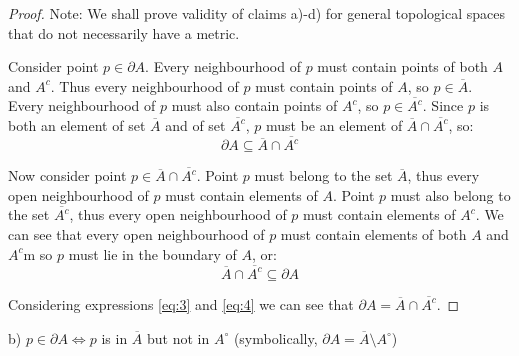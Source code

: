 \documentclass{article}
\begin{document}
\begin{proof}

Note: We shall prove validity of claims a)-d) for general topological spaces that do not necessarily have a metric.

Consider point $p \in \partial A$. Every neighbourhood of $p$ must contain points of both $A$ and $A^c$. Thus every neighbourhood of $p$ must contain points of $A$, so $p \in \overline{A}$. Every neighbourhood of $p$ must also contain points of $A^c$, so $p \in \overline{A^c}$. Since $p$ is both an element of set $\overline{A}$ and of set $\overline{A^c}$, $p$ must be an element of $\overline{A} \cap \overline{A^c}$, so:
\begin{equation} \label{eq:3}
\partial A \subseteq \overline{A} \cap \overline{A^c}
\end{equation}

Now consider point $p \in \overline{A} \cap \overline{A^c}$. Point $p$ must belong to the set $\overline{A}$, thus every open neighbourhood of $p$ must contain elements of $A$. Point $p$ must also belong to the set $\overline{A^c}$, thus every open neighbourhood of $p$ must contain elements of $A^c$. We can see that every open neighbourhood of $p$ must contain elements of both $A$ and $A^c$m so $p$ must lie in the boundary of $A$, or:
\begin{equation} \label{eq:4}
\overline{A} \cap \overline{A^c} \subseteq \partial A
\end{equation}

Considering expressions \ref{eq:3} and \ref{eq:4} we can see that $\partial A = \overline{A} \cap \overline{A^c}$.
\end{proof}

\begin{tcolorbox}
b) $p \in \partial A \iff p$ is in $\overline{A}$ but not in $A^\circ$ (symbolically, $\partial A = \overline{A} \setminus A^\circ$)
\end{tcolorbox}
\end{document}

